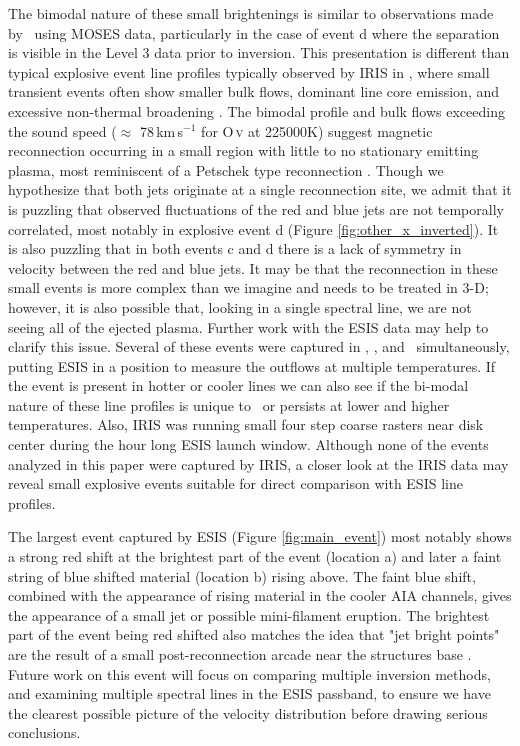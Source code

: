 	The bimodal nature of these small brightenings is similar to observations made by \citet{Rust2019} \heii \ using MOSES data, particularly in the case of event d where the separation is visible in the Level 3 data prior to inversion.
	This presentation is different than typical explosive event line profiles typically observed by IRIS in \siiv, where small transient events often show smaller bulk flows, dominant line core emission, and excessive non-thermal broadening \citep{Innes2015,Chitta2017}. 
	The bimodal profile and bulk flows exceeding the sound speed ($\approx$ 78\,km\,s$^{-1}$ for O\,\textsc{v} at 225000K) suggest magnetic reconnection occurring in a small region with little to no stationary emitting plasma, most reminiscent of a Petschek type reconnection \citep{Innes1999}.
	Though we hypothesize that both jets originate at a single reconnection site, we admit that it is puzzling that observed fluctuations of the red and blue jets are not temporally correlated, most notably in explosive event d (Figure \ref{fig:other_x_inverted}).
    It is also puzzling that in both events c and d there is a lack of symmetry in velocity between the red and blue jets.
	It may be that the reconnection in these small events is more complex than we imagine and needs to be treated in 3-D; however, it is also possible that, looking in a single spectral line, we are not seeing all of the ejected plasma. 
	Further work with the ESIS data may help to clarify this issue.
	Several of these events were captured in \hei, \mgxbright, and \ov \ simultaneously, putting ESIS in a position to measure the outflows at multiple temperatures. 
	If the event is present in hotter or cooler lines we can also see if the bi-modal nature of these line profiles is unique to \ov \ or persists at lower and higher temperatures.
	Also, IRIS was running small four step coarse rasters near disk center during the hour long ESIS launch window.
	Although none of the events analyzed in this paper were captured by IRIS, a closer look at the IRIS data may reveal small explosive events suitable for direct comparison with ESIS line profiles.
	
	The largest event captured by ESIS (Figure \ref{fig:main_event}) most notably shows a strong red shift at the brightest part of the event (location a) and later a faint string of blue shifted material (location b) rising above.
	The faint blue shift, combined with the appearance of rising material in the cooler AIA channels, gives the appearance of a small jet or possible mini-filament eruption.
	The brightest part of the event being red shifted also matches the idea that "jet bright points" are the result of a small post-reconnection arcade near the structures base \citep[see][and references therein]{Sterling2015}.
	Future work on this event will focus on comparing multiple inversion methods, and examining multiple spectral lines in the ESIS passband, to ensure we have the clearest possible picture of the velocity distribution before drawing serious conclusions.
	
